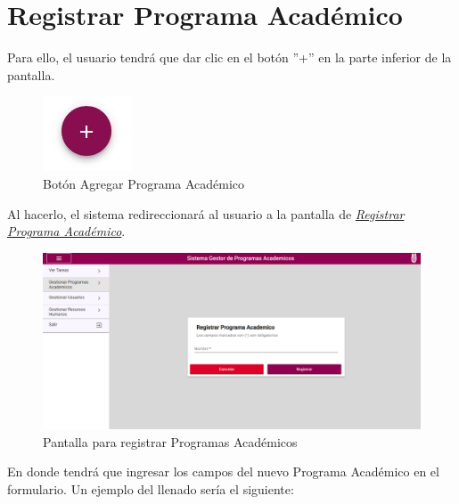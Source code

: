         \section{Registrar Programa Académico}

            Para ello, el usuario tendrá que dar clic en el botón ''+'' en la parte inferior de la pantalla.

            \begin{figure}[!hbtp]
                \centering
                \hypertarget{add}{\includegraphics[width=0.7\linewidth]{images/SP3/BtnAgregar}}
                \caption{Botón Agregar Programa Académico}
                \label{add}
            \end{figure}

            Al hacerlo, el sistema redireccionará al usuario a la pantalla de \hyperlink{registrarpa}{\textit{Registrar Programa Académico}}.

        \begin{figure}[!hbtp]
            \centering
            \hypertarget{registrarpa}{\includegraphics[width=0.7\linewidth]{images/SP3/RegistrarPA}}
            \caption{Pantalla para registrar Programas Académicos}
            \label{registrarpa}
        \end{figure}

        En donde tendrá que ingresar los campos del nuevo Programa Académico en el formulario. Un ejemplo del llenado sería el siguiente:

